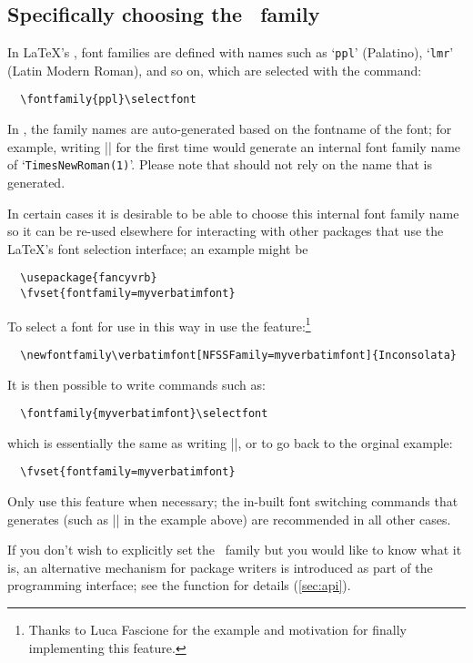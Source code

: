 \subsection{Specifically choosing the \NFSS\ family}

In \LaTeX's \NFSS, font families are defined with names such as `\texttt{ppl}' (Palatino), `\texttt{lmr}' (Latin Modern Roman), and so on, which are selected with the  command:
\begin{Verbatim}
  \fontfamily{ppl}\selectfont
\end{Verbatim}
In , the family names are auto-generated based on the fontname of the font; for example, writing || for the first time would generate an internal font family name of `\texttt{TimesNewRoman(1)}'.
Please note that should not rely on the name that is generated.

In certain cases it is desirable to be able to choose this internal font family name so it can be re-used elsewhere for interacting with other packages that use the \LaTeX's font selection interface; an example might be
\begin{Verbatim}
  \usepackage{fancyvrb}
  \fvset{fontfamily=myverbatimfont}
\end{Verbatim}
To select a font for use in this way in  use the  feature:\footnote{Thanks to Luca Fascione for the example and motivation for finally implementing this feature.}
\begin{Verbatim}
  \newfontfamily\verbatimfont[NFSSFamily=myverbatimfont]{Inconsolata}
\end{Verbatim}
It is then possible to write commands such as:
\begin{Verbatim}
  \fontfamily{myverbatimfont}\selectfont
\end{Verbatim}
which is essentially the same as writing |\verbatimfont|, or to go back to the orginal example:
\begin{Verbatim}
  \fvset{fontfamily=myverbatimfont}
\end{Verbatim}
Only use this feature when necessary; the in-built font switching commands that  generates (such as |\verbatimfont| in the example above) are recommended in all other cases.

If you don't wish to explicitly set the \NFSS\ family but you would like to know what it is, an alternative mechanism for package writers is introduced as part of the  programming interface; see the function  for details (\vref*{sec:api}).

